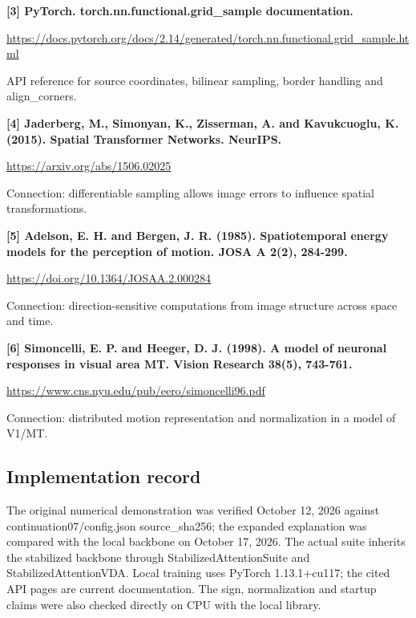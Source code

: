 \documentclass[11pt,letterpaper]{article}
\begin{document}
\textbf{[3] PyTorch. torch.nn.functional.grid\_sample documentation.}


{
\small\color{muted} \href{https://docs.pytorch.org/docs/2.14/generated/torch.nn.functional.grid_sample.html}{https:/\allowbreak{}/\allowbreak{}docs.pytorch.org/\allowbreak{}docs/\allowbreak{}2.14/\allowbreak{}generated/\allowbreak{}torch.nn.functional.grid\_sample.html}\par API reference for source coordinates, bilinear sampling, border handling and align\_corners.\par}


\textbf{[4] Jaderberg, M., Simonyan, K., Zisserman, A. and Kavukcuoglu, K. (2015). Spatial Transformer Networks. NeurIPS.}


{
\small\color{muted} \href{https://arxiv.org/abs/1506.02025}{https:/\allowbreak{}/\allowbreak{}arxiv.org/\allowbreak{}abs/\allowbreak{}1506.02025}\par Connection: differentiable sampling allows image errors to influence spatial transformations.\par}


\textbf{[5] Adelson, E. H. and Bergen, J. R. (1985). Spatiotemporal energy models for the perception of motion. JOSA A 2(2), 284-299.}


{
\small\color{muted} \href{https://doi.org/10.1364/JOSAA.2.000284}{https:/\allowbreak{}/\allowbreak{}doi.org/\allowbreak{}10.1364/\allowbreak{}JOSAA.2.000284}\par Connection: direction-sensitive computations from image structure across space and time.\par}


\textbf{[6] Simoncelli, E. P. and Heeger, D. J. (1998). A model of neuronal responses in visual area MT. Vision Research 38(5), 743-761.}


{
\small\color{muted} \href{https://www.cns.nyu.edu/pub/eero/simoncelli96.pdf}{https:/\allowbreak{}/\allowbreak{}www.cns.nyu.edu/\allowbreak{}pub/\allowbreak{}eero/\allowbreak{}simoncelli96.pdf}\par Connection: distributed motion representation and normalization in a model of V1/\allowbreak{}MT.\par}


\subsection*{Implementation record}

{
\small\color{muted} The original numerical demonstration was verified October 12, 2026 against continuation07/\allowbreak{}config.json source\_sha256; the expanded explanation was compared with the local backbone on October 17, 2026. The actual suite inherits the stabilized backbone through StabilizedAttentionSuite and StabilizedAttentionVDA. Local training uses PyTorch 1.13.1+cu117; the cited API pages are current documentation. The sign, normalization and startup claims were also checked directly on CPU with the local library.\par}
\end{document}

